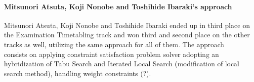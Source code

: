 



\paragraph{Mitsunori Atsuta, Koji Nonobe and Toshihide Ibaraki's approach}

Mitsunori Atsuta, Koji Nonobe and Toshihide Ibaraki ended up in third place on the Examination Timetabling track and won third and second place on the other tracks as well, utilizing the same approach for all of them. The approach~\cite{Ibaraki2007} consists on applying constraint satisfaction problem solver adopting an hybridization of Tabu Search and Iterated Local Search (modification of local search method), handling weight constraints (?).\\

